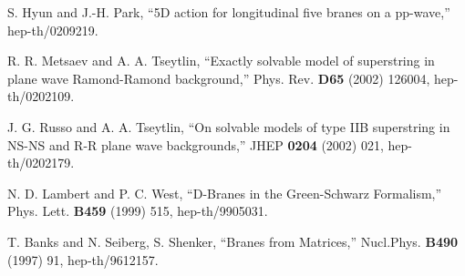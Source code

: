 \documentclass[a4paper,12pt]{article}
\begin{document}
\begin{thebibliography}{99}
 S. Hyun and J.-H. Park, ``5D action for longitudinal
five branes on a pp-wave,'' hep-th/0209219.

 R. R. Metsaev and A. A. Tseytlin,
  ``Exactly solvable model of superstring in plane wave Ramond-Ramond
  background,'' Phys.  Rev. {\bf D65} (2002) 126004, hep-th/0202109.

 J. G. Russo and A. A. Tseytlin, ``On solvable models
  of type IIB superstring in NS-NS and R-R plane wave backgrounds,''
  JHEP {\bf 0204} (2002) 021, hep-th/0202179.

 N. D. Lambert and P. C. West, ``D-Branes in the
  Green-Schwarz Formalism,'' Phys. Lett. {\bf B459} (1999) 515,
  hep-th/9905031.
 
 T. Banks and N. Seiberg, S. Shenker, ``Branes from
Matrices,'' Nucl.Phys. {\bf B490} (1997) 91, hep-th/9612157.
 
\end{thebibliography}
\end{document}
